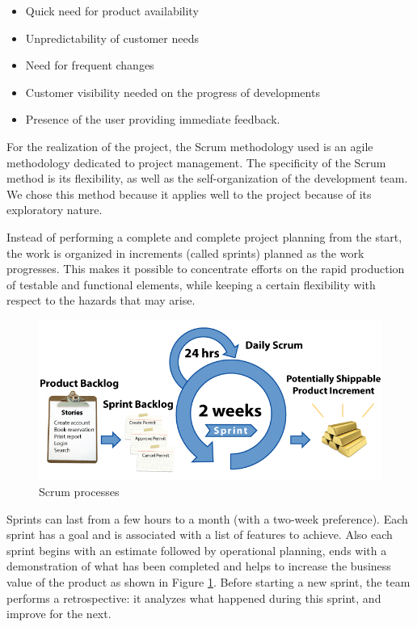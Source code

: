 \documentclass[12pt,a4paper]{report}
\begin{document}
	\begin{itemize}
		\item Quick need for product availability
		\item Unpredictability of customer needs
		\item Need for frequent changes
		\item Customer visibility needed on the progress of developments
		\item Presence of the user providing immediate feedback.
		
	\end{itemize}
	\clearpage
	For the realization of the project, the Scrum methodology used is an agile methodology dedicated to project management. The specificity of the Scrum method is its flexibility, as well as the self-organization of the development team. We chose this method because it applies well to the project because of its exploratory nature.\par
	Instead of performing a complete and complete project planning from the start, the work is organized in increments (called sprints) planned as the work progresses. This makes it possible to concentrate efforts on the rapid production of testable and functional elements, while keeping a certain flexibility with respect to the hazards that may arise.\par
	\begin{figure}[H]
		\centering
		\includegraphics[width=5in,keepaspectratio]{scrum.png}
		\caption{ Scrum processes\protect{}\protect\footnotemark[\thefootnote]}
		
		
		\label{scrum-label}
	\end{figure}
	Sprints can last from a few hours to a month (with a two-week preference). Each sprint has a goal and is associated with a list of features to achieve. Also each sprint begins with an estimate followed by operational planning, ends with a demonstration of what has been completed and helps to increase the business value of the product as shown in Figure \ref{scrum-label}. Before starting a new sprint, the team performs a retrospective: it analyzes what happened during this sprint, and improve for the next.
\end{document}
